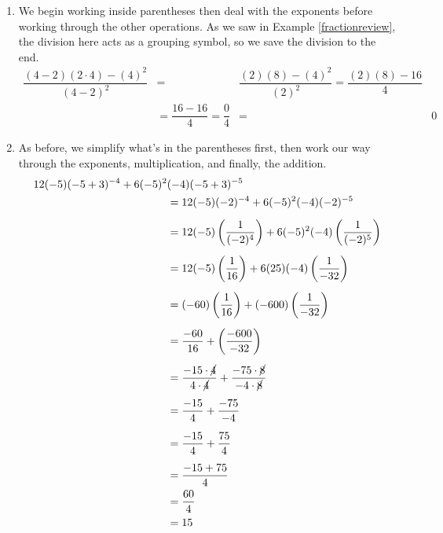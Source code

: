 {
\begin{enumerate}

\item  We begin working inside parentheses then deal with the exponents before working through the other operations.  As we saw in Example \ref{fractionreview}, the division here acts as a grouping symbol, so we save the division to the end.
\begin{align*}
\dfrac{(4-2)(2 \cdot 4)-(4)^2}{(4-2)^2} & = & \dfrac{(2)(8)-(4)^2}{(2)^2}  = \dfrac{(2)(8)-16}{4} \\
 & =  \dfrac{16-16}{4} = \dfrac{0}{4} & = & 0 
\end{align*}

\item  As before, we simplify what's in the parentheses first, then work our way through the exponents, multiplication, and finally, the addition.
\begin{align*}
12(-5)(-5+3)^{-4}+6(-5)^2&(-4)(-5+3)^{-5}\\
&  =  12(-5)(-2)^{-4} + 6(-5)^{2}(-4)(-2)^{-5} \\[5pt] 
                                         & =  12(-5)\left(\dfrac{1}{(-2)^4}\right) + 6(-5)^{2}(-4)\left(\dfrac{1}{(-2)^5}\right) \\[5pt]                                         
                                         & =  12(-5)\left(\dfrac{1}{16}\right) + 6(25)(-4)\left(\dfrac{1}{-32}\right) \\[5pt]
& =  (-60)\left(\dfrac{1}{16}\right) + (-600)\left(\dfrac{1}{-32}\right) \\[5pt]
& =  \dfrac{-60}{16} + \left(\dfrac{-600}{-32}\right)  \\[5pt]
& =  \dfrac{-15\cdot \cancel{4}}{4 \cdot \cancel{4}} + \dfrac{-75 \cdot \cancel{8}}{-4 \cdot \cancel{8}}  \\[5pt]
		& =  \dfrac{-15}{4} + \dfrac{-75}{-4}  \\[5pt]
			& =  \dfrac{-15}{4} + \dfrac{75}{4}  \\[5pt]
				& =  \dfrac{-15 + 75}{4}  \\
				& =  \dfrac{60}{4}  \\
	       & =  15  
\end{align*}

\drawexampleline


\end{enumerate}}
